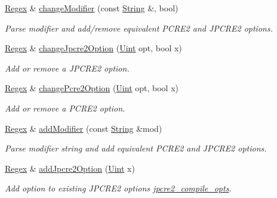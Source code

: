 \begin{DoxyCompactItemize}
\hyperlink{classjpcre2_1_1Regex}{Regex} \& \hyperlink{classjpcre2_1_1Regex_a9ab3efed9819a51225456e6d8487de56_a9ab3efed9819a51225456e6d8487de56}{change\+Modifier} (const \hyperlink{namespacejpcre2_a91f03070152fb228bc116c5a737f1d16}{String} \&, bool)
\begin{DoxyCompactList}\small\item\em Parse modifier and add/remove equivalent P\+C\+R\+E2 and J\+P\+C\+R\+E2 options. \end{DoxyCompactList}\item 
\hyperlink{classjpcre2_1_1Regex}{Regex} \& \hyperlink{classjpcre2_1_1Regex_ab8e0b1a49eeb1077ba54cf3b5292c95e_ab8e0b1a49eeb1077ba54cf3b5292c95e}{change\+Jpcre2\+Option} (\hyperlink{namespacejpcre2_a078242d38221a13fb3543b9edd78c099}{Uint} opt, bool x)
\begin{DoxyCompactList}\small\item\em Add or remove a J\+P\+C\+R\+E2 option. \end{DoxyCompactList}\item 
\hyperlink{classjpcre2_1_1Regex}{Regex} \& \hyperlink{classjpcre2_1_1Regex_ae5bde8008cc5a700163ca3162dbd5823_ae5bde8008cc5a700163ca3162dbd5823}{change\+Pcre2\+Option} (\hyperlink{namespacejpcre2_a078242d38221a13fb3543b9edd78c099}{Uint} opt, bool x)
\begin{DoxyCompactList}\small\item\em Add or remove a P\+C\+R\+E2 option. \end{DoxyCompactList}\item 
\hyperlink{classjpcre2_1_1Regex}{Regex} \& \hyperlink{classjpcre2_1_1Regex_ab1af1471339602446d8221b8c97c6b55_ab1af1471339602446d8221b8c97c6b55}{add\+Modifier} (const \hyperlink{namespacejpcre2_a91f03070152fb228bc116c5a737f1d16}{String} \&mod)
\begin{DoxyCompactList}\small\item\em Parse modifier string and add equivalent P\+C\+R\+E2 and J\+P\+C\+R\+E2 options. \end{DoxyCompactList}\item 
\hyperlink{classjpcre2_1_1Regex}{Regex} \& \hyperlink{classjpcre2_1_1Regex_a03974fa7ba8f7c47186cb8d6f54934de_a03974fa7ba8f7c47186cb8d6f54934de}{add\+Jpcre2\+Option} (\hyperlink{namespacejpcre2_a078242d38221a13fb3543b9edd78c099}{Uint} x)
\begin{DoxyCompactList}\small\item\em Add option to existing J\+P\+C\+R\+E2 options \hyperlink{classjpcre2_1_1Regex_abdd26c3bc1c3132f0aa73dde1690a7ef}{jpcre2\+\_\+compile\+\_\+opts}. \end{DoxyCompactList}\item 

\end{DoxyCompactItemize}
